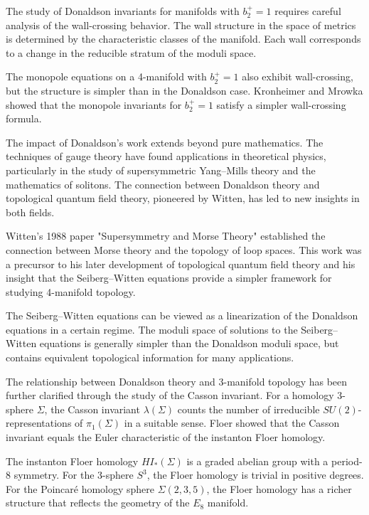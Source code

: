 The study of Donaldson invariants for manifolds with $b_2^+ = 1$ requires careful analysis of the wall-crossing behavior. The wall structure in the space of metrics is determined by the characteristic classes of the manifold. Each wall corresponds to a change in the reducible stratum of the moduli space.

The monopole equations on a 4-manifold with $b_2^+ = 1$ also exhibit wall-crossing, but the structure is simpler than in the Donaldson case. Kronheimer and Mrowka showed that the monopole invariants for $b_2^+ = 1$ satisfy a simpler wall-crossing formula.

The impact of Donaldson's work \cite{donaldson1983} extends beyond pure mathematics. The techniques of gauge theory have found applications in theoretical physics, particularly in the study of supersymmetric Yang--Mills theory and the mathematics of solitons. The connection between Donaldson theory and topological quantum field theory, pioneered by Witten, has led to new insights in both fields.

Witten's 1988 paper "Supersymmetry and Morse Theory" established the connection between Morse theory and the topology of loop spaces. This work was a precursor to his later development of topological quantum field theory and his insight that the Seiberg--Witten equations provide a simpler framework for studying 4-manifold topology.

The Seiberg--Witten equations can be viewed as a linearization of the Donaldson equations in a certain regime. The moduli space of solutions to the Seiberg--Witten equations is generally simpler than the Donaldson moduli space, but contains equivalent topological information for many applications.

The relationship between Donaldson theory and 3-manifold topology has been further clarified through the study of the Casson invariant. For a homology 3-sphere $\Sigma$, the Casson invariant $\lambda(\Sigma)$ counts the number of irreducible $SU(2)$-representations of $\pi_1(\Sigma)$ in a suitable sense. Floer showed that the Casson invariant equals the Euler characteristic of the instanton Floer homology.

The instanton Floer homology $HI_*(\Sigma)$ is a graded abelian group with a period-8 symmetry. For the 3-sphere $S^3$, the Floer homology is trivial in positive degrees. For the Poincaré homology sphere $\Sigma(2,3,5)$, the Floer homology has a richer structure that reflects the geometry of the $E_8$ manifold.

